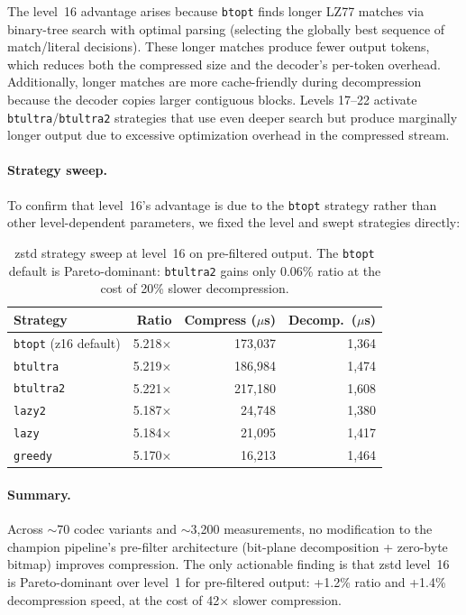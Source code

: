 \documentclass[10pt,twocolumn,letterpaper]{article}
\begin{document}
The level~16 advantage arises because \texttt{btopt} finds longer LZ77 matches via binary-tree search with optimal parsing (selecting the globally best sequence of match/literal decisions).
These longer matches produce fewer output tokens, which reduces both the compressed size and the decoder's per-token overhead.
Additionally, longer matches are more cache-friendly during decompression because the decoder copies larger contiguous blocks.
Levels 17--22 activate \texttt{btultra}/\texttt{btultra2} strategies that use even deeper search but produce marginally longer output due to excessive optimization overhead in the compressed stream.

\paragraph{Strategy sweep.}
To confirm that level~16's advantage is due to the \texttt{btopt} strategy rather than other level-dependent parameters, we fixed the level and swept strategies directly:

\begin{table}[h]
\centering
\caption{zstd strategy sweep at level~16 on pre-filtered output. The \texttt{btopt} default is Pareto-dominant: \texttt{btultra2} gains only 0.06\% ratio at the cost of 20\% slower decompression.}
\label{tab:strategy_sweep}
\footnotesize
\begin{tabular}{lrrr}
\toprule
Strategy & Ratio & Compress ($\mu$s) & Decomp.\ ($\mu$s) \\
\midrule
\texttt{btopt} (z16 default) & 5.218$\times$ & 173{,}037 & 1{,}364 \\
\texttt{btultra} & 5.219$\times$ & 186{,}984 & 1{,}474 \\
\texttt{btultra2} & 5.221$\times$ & 217{,}180 & 1{,}608 \\
\texttt{lazy2} & 5.187$\times$ & 24{,}748 & 1{,}380 \\
\texttt{lazy} & 5.184$\times$ & 21{,}095 & 1{,}417 \\
\texttt{greedy} & 5.170$\times$ & 16{,}213 & 1{,}464 \\
\bottomrule
\end{tabular}
\end{table}

\paragraph{Summary.}
Across $\sim$70 codec variants and $\sim$3{,}200 measurements, no modification to the champion pipeline's pre-filter architecture (bit-plane decomposition + zero-byte bitmap) improves compression.
The only actionable finding is that zstd level~16 is Pareto-dominant over level~1 for pre-filtered output: +1.2\% ratio and +1.4\% decompression speed, at the cost of 42$\times$ slower compression.
\end{document}
